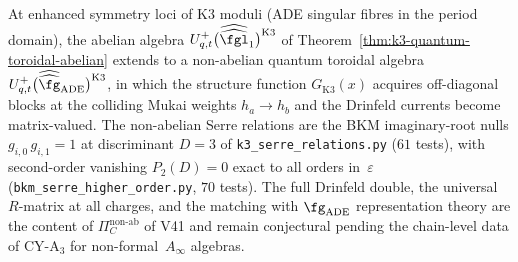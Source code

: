 \begin{conjecture}
\label{conj:k3-quantum-toroidal-nonabelian}
\ClaimStatusConjectured
At enhanced symmetry loci of K$3$ moduli (ADE singular fibres in the
period domain), the abelian algebra
$U^+_{q,t}\bigl(\widehat{\widehat{\fgl}}_1\bigr)^{\mathrm{K}3}$ of
Theorem~\ref{thm:k3-quantum-toroidal-abelian} extends to a non-abelian
quantum toroidal algebra $U^+_{q,t}\bigl(\widehat{\widehat{\fg}}_{\mathrm{ADE}}\bigr)^{\mathrm{K}3}$,
in which the structure function $G_{\mathrm{K}3}(x)$ acquires
off-diagonal blocks at the colliding Mukai weights $h_a \to h_b$ and the
Drinfeld currents become matrix-valued.  The non-abelian Serre relations
are the BKM imaginary-root nulls $g_{i,0}\, g_{i,1} = 1$ at discriminant
$D = 3$ of \texttt{k3\_serre\_relations.py} ($61$ tests), with second-order
vanishing $P_2(D) = 0$ exact to all orders in~$\varepsilon$
(\texttt{bkm\_serre\_higher\_order.py}, $70$ tests).
The full Drinfeld double, the universal $R$-matrix at all charges, and
the matching with $\fg_{\mathrm{ADE}}$ representation theory are the
content of $\Pi_C^{\mathrm{non\text{-}ab}}$ of V41 and remain
conjectural pending the chain-level data of CY-A$_3$ for
non-formal~$A_\infty$ algebras.
\end{conjecture}

